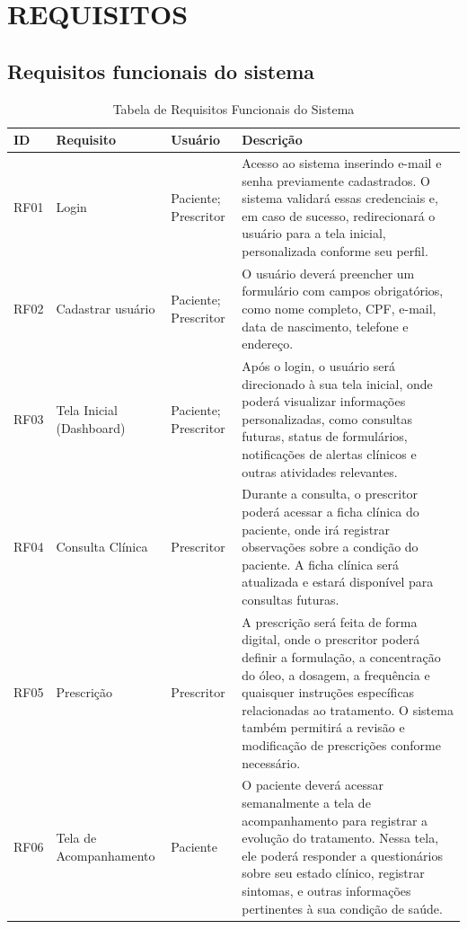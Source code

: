 \href{}{}\documentclass[12pt,portuguese,oneside]{article}
\begin{document}
\section{REQUISITOS}

\subsection{Requisitos funcionais do sistema}

\begin{table}[H]
\centering
\caption{Tabela de Requisitos Funcionais do Sistema}
\begin{tabularx}{\textwidth}{|>{\raggedright\arraybackslash}p{1cm}|>{\raggedright\arraybackslash}p{2.5cm}|>{\raggedright\arraybackslash}p{2cm}|>{\raggedright\arraybackslash}X|}
\hline
\rowcolor{gray!20}
\textbf{ID} & \textbf{Requisito} & \textbf{Usuário} & \textbf{Descrição}\\
\hline
RF01 & Login & Paciente; Prescritor & Acesso ao sistema inserindo e-mail e senha previamente cadastrados. O sistema validará essas credenciais e, em caso de sucesso, redirecionará o usuário para a tela inicial, personalizada conforme seu perfil.\\
\hline
RF02 & Cadastrar usuário & Paciente; Prescritor & O usuário deverá preencher um formulário com campos obrigatórios, como nome completo, CPF, e-mail, data de nascimento, telefone e endereço.\\
\hline
RF03 & Tela Inicial (Dashboard) & Paciente; Prescritor & Após o login, o usuário será direcionado à sua tela inicial, onde poderá visualizar informações personalizadas, como consultas futuras, status de formulários, notificações de alertas clínicos e outras atividades relevantes.\\
\hline
RF04 & Consulta Clínica & Prescritor & Durante a consulta, o prescritor poderá acessar a ficha clínica do paciente, onde irá registrar observações sobre a condição do paciente. A ficha clínica será atualizada e estará disponível para consultas futuras.\\
\hline
RF05 & Prescrição & Prescritor & A prescrição será feita de forma digital, onde o prescritor poderá definir a formulação, a concentração do óleo, a dosagem, a frequência e quaisquer instruções específicas relacionadas ao tratamento. O sistema também permitirá a revisão e modificação de prescrições conforme necessário.\\
\hline
RF06 & Tela de Acompanhamento & Paciente & O paciente deverá acessar semanalmente a tela de acompanhamento para registrar a evolução do tratamento. Nessa tela, ele poderá responder a questionários sobre seu estado clínico, registrar sintomas, e outras informações pertinentes à sua condição de saúde.\\

\end{tabularx}
\end{table}
\end{document}
